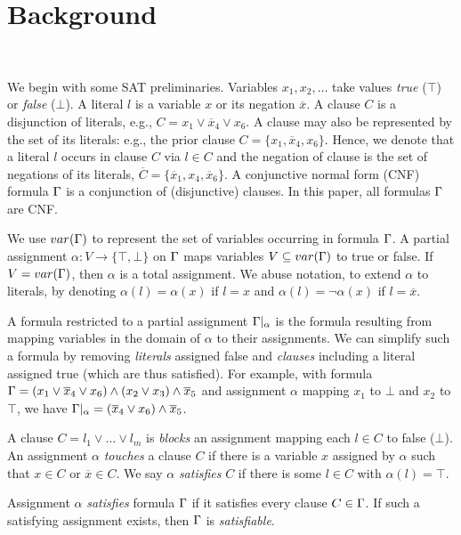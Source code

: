 \section{Background}~\label{sec:background}

We begin with some SAT preliminaries. Variables $x_1, x_2, \dots$ take values
\emph{true} ($\top$) or \emph{false} ($\bot$). A literal $l$ is a variable $x$
or its negation $\overline{x}$. A clause $C$ is a disjunction of literals, e.g.,
$C = x_1 \lor \overline{x}_4 \lor x_6$. A clause may also be represented by the
set of its literals: e.g., the prior clause $C = \{x_1, \overline{x}_4, x_6\}$.
Hence, we denote that a literal $l$ occurs in clause $C$ via $l \in C$ and the
negation of clause is the set of negations of its literals, $\overline{C} =
\{\overline{x}_1, x_4, \overline{x}_6\}$. A conjunctive normal form (CNF)
formula $\Gamma$ is a conjunction of (disjunctive) clauses. In this paper, all
formulas $\Gamma$ are CNF.

We use $var(\Gamma)$ to represent the set of variables occurring in formula
$\Gamma$. A partial assignment $\alpha : V \rightarrow \{\top, \bot\}$ on
$\Gamma$ maps variables $V \subseteq var(\Gamma)$ to true or false. If $V =
var(\Gamma)$, then $\alpha$ is a total assignment. We abuse notation, to
extend $\alpha$ to literals, by denoting $\alpha(l) = \alpha(x)$
if $l = x$ and $\alpha(l) = \neg \alpha(x)$ if $l = \overline{x}$.

A formula restricted to a partial assignment $\Gamma|_\alpha$ is the formula
resulting from mapping variables in the domain of $\alpha$ to their assignments.
We can simplify such a formula by removing \emph{literals} assigned false and
\emph{clauses} including a literal assigned true (which are thus satisfied). For
example, with formula $\Gamma = (x_1 \lor \overline{x}_4 \lor x_6) \land (x_2
\lor x_3) \land \overline{x}_5$ and assignment $\alpha$ mapping $x_1$ to $\bot$
and $x_2$ to $\top$, we have $\Gamma|_\alpha = (\overline{x}_4 \lor x_6) \land
\overline{x}_5$.

A clause $C = l_1 \lor \dots \lor l_m$ is \emph{blocks} an assignment
mapping each $l \in C$ to false ($\bot$). An assignment $\alpha$ \emph{touches}
a clause $C$ if there is a variable $x$ assigned by $\alpha$ such that $x \in C$
or $\overline{x} \in C$. We say $\alpha$ \emph{satisfies} $C$ if there is some
$l \in C$ with $\alpha(l) = \top$.

Assignment $\alpha$ \emph{satisfies} formula $\Gamma$ if it satisfies every
clause $C \in \Gamma$. If such a satisfying assignment exists, then $\Gamma$
is \emph{satisfiable}.

